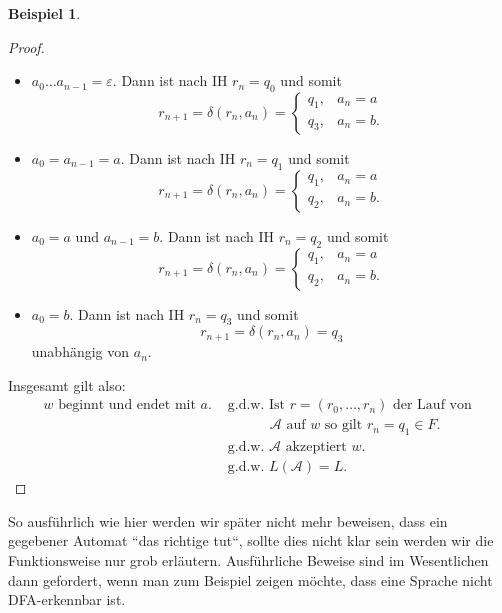 \documentclass[11pt, a4paper]{article}
\theoremstyle{definition}
\newtheorem{example}[definition]{Beispiel}
\theoremstyle{plain}
\numberwithin{equation}{section}
\begin{document}
\begin{example}
\begin{proof}
		\begin{itemize}
			\item $a_0 \ldots a_{n-1} = \varepsilon$. Dann ist nach IH $r_n = q_0$ und somit
				$$
					r_{n+1} = \delta(r_n, a_n) = \left\lbrace
							\begin{array}{ll}
								q_1, & a_n = a\\
								q_3, & a_n = b.
							\end{array}
						\right.
				$$
			\item $a_0 = a_{n-1} = a$. Dann ist nach IH $r_n = q_1$ und somit
				$$
					r_{n+1} = \delta(r_n, a_n) = \left\lbrace
							\begin{array}{ll}
								q_1, & a_n = a\\
								q_2, & a_n = b.
							\end{array}
						\right.
				$$
			\item $a_0 = a$ und $a_{n-1} = b$. Dann ist nach IH $r_n = q_2$ und somit
				$$
					r_{n+1} = \delta(r_n, a_n) = \left\lbrace
							\begin{array}{ll}
								q_1, & a_n = a\\
								q_2, & a_n = b.
							\end{array}
						\right.
				$$
			\item $a_0 = b$. Dann ist nach IH $r_n = q_3$ und somit
				$$
					r_{n+1} = \delta(r_n, a_n) = q_3
				$$
				unabhängig von $a_n$.
		\end{itemize}
		Insgesamt gilt also: 
		\begin{align*}
			w \text{ beginnt und endet mit } a. &\text{ g.d.w. } \text{Ist } r = (r_0, \ldots, r_n) \text{ der Lauf von }\\ &\quad\quad\quad\,\, \mathcal{A} \text{ auf } w \text{ so gilt } r_n = q_1 \in F.\\
			&\text{ g.d.w. } \mathcal{A} \text{ akzeptiert } w.\\
			&\text{ g.d.w. } L(\mathcal{A}) = L.
		\end{align*}
	\end{proof}
\end{example}
So ausführlich wie hier werden wir später nicht mehr beweisen, dass ein gegebener Automat ``das richtige tut``, sollte dies nicht klar sein werden wir die Funktionsweise nur grob erläutern. Ausführliche Beweise sind im Wesentlichen dann gefordert, wenn man zum Beispiel zeigen möchte, dass eine Sprache nicht DFA-erkennbar ist.
\end{document}
